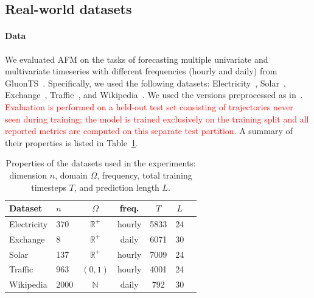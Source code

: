 \documentclass[a4paper,10pt,twocolumn,preprint,3p]{elsarticle}
\begin{document}
\subsection{Real-world datasets}\label{subsec:realworld}

\paragraph{Data} We evaluated AFM on the tasks
of forecasting multiple univariate and multivariate timeseries with different frequencies (hourly and daily) from GluonTS~\citep{alexandrov2020gluonts}. Specifically, we used the following datasets: Electricity~\citep{lai2018modeling}, Solar~\citep{lai2018modeling}, Exchange~\citep{dua2017uci}, Traffic~\citep{dua2017uci}, and Wikipedia~\citep{gasthaus2019probabilistic}. 
We used the versions preprocessed as in~\citep{salinas2019high}. \textcolor{red}{Evaluation is performed on a held-out test set consisting of trajectories never seen during training; the model is trained exclusively on the training split and all reported metrics are computed on this separate test partition.} A summary of their properties is listed in Table~\ref{tab:dataset-details}.

\begin{table}
\centering
\small
\caption{Properties of the datasets used in the experiments: dimension \( n \), domain \( \Omega \), frequency, total training timesteps $T$, and prediction length $L$.}
\label{tab:dataset-details}
\begin{small}
\begin{tabular}{llccccc}
\toprule
Dataset & $n$ & $\Omega$ & freq. & $T$ & $L$\\
\midrule
Electricity  & 370 & $\mathbb{R}^+$ & hourly & 5833 & 24\\
Exchange & 8 & $\mathbb{R}^+$ & daily & 6071 & 30 \\
Solar & 137 & $\mathbb{R}^+$ & hourly & 7009 & 24 \\
Traffic & 963 & $(0,1)$ & hourly & 4001 & 24\\
Wikipedia & 2000 & $\mathbb{N}$ & daily & 792 & 30\\
\bottomrule
\end{tabular}
\end{small}
\end{table}
\end{document}
